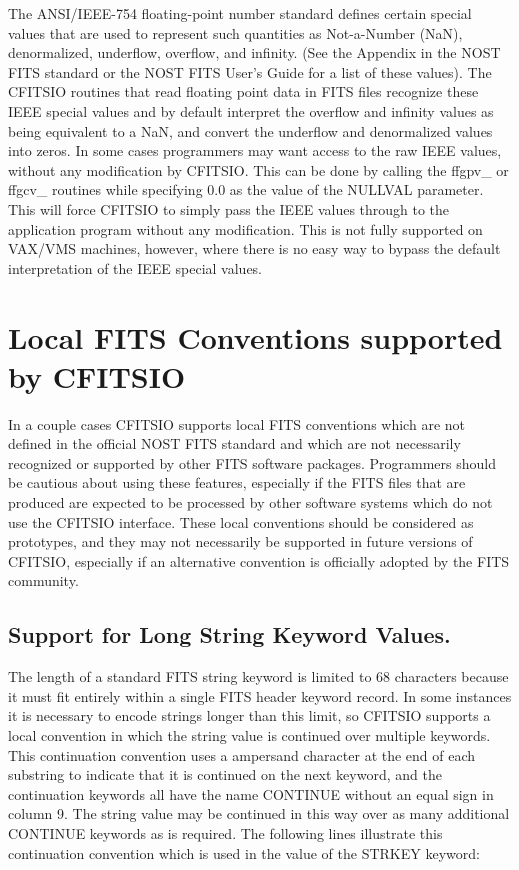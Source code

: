 The ANSI/IEEE-754 floating-point number standard defines certain
special values that are used to represent such quantities as
Not-a-Number (NaN), denormalized, underflow, overflow, and infinity.
(See the Appendix in the NOST FITS standard or the NOST FITS User's
Guide for a list of these values).  The CFITSIO routines that read
floating point data in FITS files recognize these IEEE special values
and by default interpret the overflow and infinity values as being
equivalent to a NaN, and convert the underflow and denormalized values
into zeros.  In some cases programmers may want access to the raw IEEE
values, without any modification by CFITSIO.  This can be done by
calling the ffgpv\_ or ffgcv\_ routines while specifying 0.0 as the
value of the NULLVAL parameter.  This will force CFITSIO to simply pass
the IEEE values through to the application program without any
modification.  This is not fully supported on VAX/VMS machines,
however, where there is no easy way to bypass the default
interpretation of the IEEE special values.


\section{Local FITS Conventions supported by CFITSIO}

In a couple cases CFITSIO supports local FITS conventions which are not
defined in the official NOST FITS standard and which are not
necessarily recognized or supported by other FITS software packages.
Programmers should be cautious about using these features, especially
if the FITS files that are produced are expected to be processed by
other software systems which do not use the CFITSIO interface.  These
local conventions should be considered as prototypes, and they may not
necessarily be supported in future versions of CFITSIO, especially if
an alternative convention is officially adopted by the FITS community.


\subsection{Support for Long String Keyword Values.}

The length of a standard FITS string keyword is limited to 68
characters because it must fit entirely within a single FITS header
keyword record.  In some instances it is necessary to encode strings
longer than this limit, so CFITSIO supports a local convention in which
the string value is continued over multiple keywords.  This
continuation convention uses a ampersand character at the end of each
substring to indicate that it is continued on the next keyword, and the
continuation keywords all have the name CONTINUE without an equal sign
in column 9. The string value may be continued in this way over as many
additional CONTINUE keywords as is required.  The following lines
illustrate this continuation convention which is used in the value of
the STRKEY keyword:


